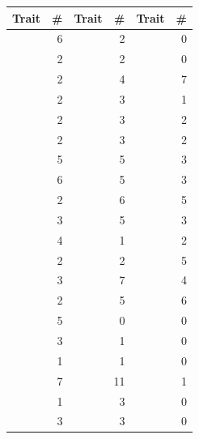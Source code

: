 \begin{tabular}{@{}lr@{\hspace{1em}}lr@{\hspace{1em}}lr@{}}
\toprule
Trait & \# & Trait & \# & Trait & \# \\
\midrule
\ct{TAccess} & 6 & \ct{TImplementable} & 2 & \ct{TTraitUsage} & 0 \\
\ct{TAccessible} & 2 & \ct{TImplementation} & 2 & \ct{TTraitUser} & 0 \\
\ct{TAnnotationInstance} & 2 & \ct{TImplicitVariable} & 4 & \ct{TType} & 7 \\
\ct{TAnnotationInstanceAttribute} & 2 & \ct{TImport} & 3 & \ct{TTypeAlias} & 1 \\
\ct{TAnnotationType} & 2 & \ct{TImportable} & 3 & \ct{TTypeArgument} & 2 \\
\ct{TAnnotationTypeAttribute} & 2 & \ct{TIndexedFileNavigation} & 3 & \ct{TTypedEntity} & 2 \\
\ct{TAssociation} & 5 & \ct{TInheritance} & 5 & \ct{TTypeParameter} & 3 \\
\ct{TAttribute} & 6 & \ct{TInvocable} & 5 & \ct{TUnknownVariable} & 3 \\
\ct{TBytesFileAnchor} & 2 & \ct{TInvocation} & 6 & \ct{TWithAccesses} & 5 \\
\ct{TCanBeAbstract} & 3 & \ct{TInvocationsReceiver} & 5 & \ct{TWithAnnotationInstances} & 3 \\
\ct{TCanBeClassSide} & 4 & \ct{TLambda} & 1 & \ct{TWithAnnotationTypes} & 2 \\
\ct{TCanBeFinal} & 2 & \ct{TLCOMMetrics} & 2 & \ct{TWithAttributes} & 5 \\
\ct{TCanBeStub} & 3 & \ct{TLocalVariable} & 7 & \ct{TWithClasses} & 4 \\
\ct{TCanImplement} & 2 & \ct{TMethod} & 5 & \ct{TWithComments} & 6 \\
\ct{TClass} & 5 & \ct{TMethodMetrics} & 0 & \ct{TWithCompilationUnits} & 0 \\
\ct{TClassMetrics} & 3 & \ct{TModule} & 1 & \ct{TWithDereferencedInvocations} & 0 \\
\ct{TCohesionCouplingMetrics} & 1 & \ct{TMultipleFileAnchor} & 1 & \ct{TWithEnumValues} & 0 \\
\ct{TComment} & 7 & \ct{TNamedEntity} & 11 & \ct{TWithExceptions} & 1 \\
\ct{TCompilationUnit} & 1 & \ct{TNamespace} & 3 & \ct{TWithFileIncludes} & 0 \\
\ct{TConcretization} & 3 & \ct{TPackage} & 3 & \ct{TWithFiles} & 0 \\

\end{tabular}
